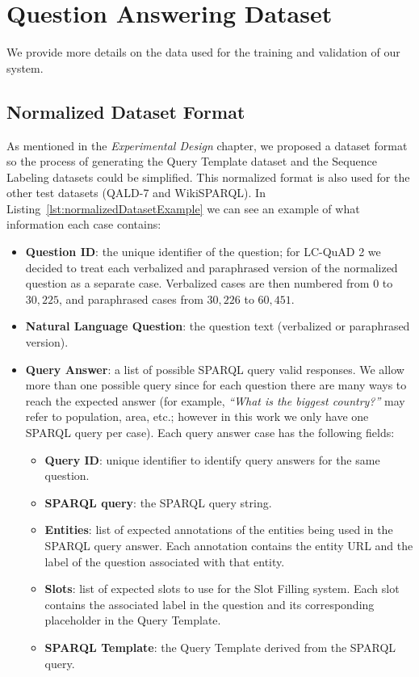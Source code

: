 \chapter{Question Answering Dataset}
\label{appendix:qaDataset}
We provide more details on the data used for the training and validation of our system.

\section{Normalized Dataset Format}
\label{appendix:qaDataset/normalizedFormat}
As mentioned in the \textit{Experimental Design} chapter, we proposed a dataset format so the process 
of generating the Query Template dataset and the Sequence Labeling datasets could be simplified. This 
normalized format is also used for the other test datasets (QALD-7 and WikiSPARQL). In 
Listing~\ref{lst:normalizedDatasetExample} we can see an example of what information each case contains:

\begin{itemize}
    \item \textbf{Question ID}: the unique identifier of the question; for LC-QuAD 2 we decided to 
    treat each verbalized and paraphrased version of the normalized question as a separate case. 
    Verbalized cases are then numbered from $0$ to $30,225$, and paraphrased cases from $30,226$ to $60,451$.
    \item \textbf{Natural Language Question}: the question text (verbalized or paraphrased version).
    \item \textbf{Query Answer}: a list of possible SPARQL query valid responses. We allow more than 
    one possible query since for each question there are many ways to reach the expected answer (for 
    example, \textit{“What is the biggest country?”} may refer to population, area, etc.; however in 
    this work we only have one SPARQL query per case). Each query answer case has the following fields:
    \begin{itemize}
        \item \textbf{Query ID}: unique identifier to identify query answers for the same question.
        \item \textbf{SPARQL query}: the SPARQL query string.
        \item \textbf{Entities}: list of expected annotations of the entities being used in the 
        SPARQL query answer. Each annotation contains the entity URL and the label of the question 
        associated with that entity.
        \item \textbf{Slots}: list of expected slots to use for the Slot Filling system. Each slot 
        contains the associated label in the question and its corresponding placeholder in the Query 
        Template.
        \item \textbf{SPARQL Template}: the Query Template derived from the SPARQL query.
    \end{itemize}
\end{itemize}

